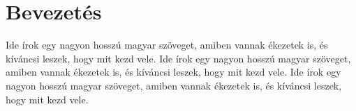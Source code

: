 \section{Bevezetés}

Ide írok egy nagyon hosszú magyar szöveget, amiben vannak ékezetek is, és kíváncsi leszek, hogy mit kezd vele.
Ide írok egy nagyon hosszú magyar szöveget, amiben vannak ékezetek is, és kíváncsi leszek, hogy mit kezd vele.
Ide írok egy nagyon hosszú magyar szöveget, amiben vannak ékezetek is, és kíváncsi leszek, hogy mit kezd vele.
